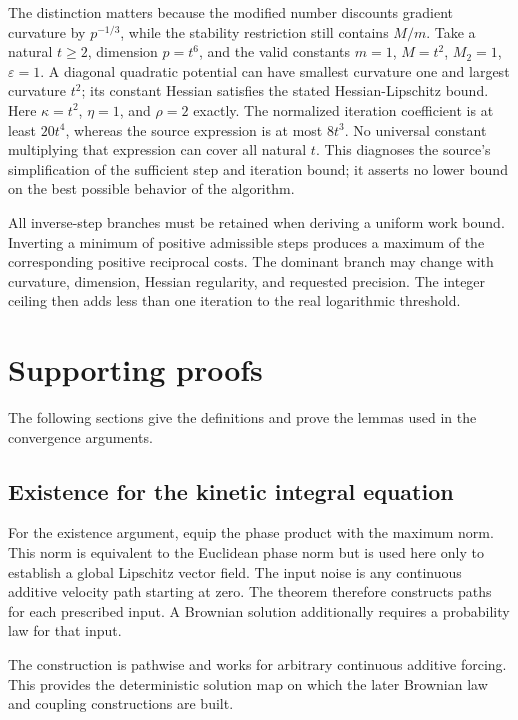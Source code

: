 \documentclass[11pt,a4paper]{report}
\begin{document}
The distinction matters because the modified number discounts gradient
curvature by \(p^{-1/3}\), while the stability restriction still
contains \(M/m\). Take a natural \(t\ge2\), dimension \(p=t^6\),
and the valid constants \(m=1\), \(M=t^2\), \(M_2=1\),
\(\varepsilon=1\). A diagonal quadratic potential can have smallest
curvature one and largest curvature \(t^2\); its constant Hessian satisfies
the stated Hessian-Lipschitz bound. Here \(\kappa=t^2\),
\(\eta=1\), and \(\rho=2\) exactly. The normalized iteration
coefficient is at least \(20t^4\), whereas the source expression is at most
\(8t^3\). No universal constant multiplying that expression can cover all
natural \(t\). This diagnoses the source's simplification of the sufficient step and iteration bound;
it asserts no lower bound on the best possible behavior of the algorithm.



All inverse-step branches must be retained when deriving a uniform work bound. Inverting a minimum of positive admissible steps produces a maximum of the corresponding positive reciprocal costs. The dominant branch may change with curvature, dimension, Hessian regularity, and requested precision. The integer ceiling then adds less than one iteration to the real logarithmic threshold.

\chapter{Supporting proofs}
The following sections give the definitions and prove the lemmas used in the convergence arguments.

\section{\texorpdfstring{Existence for the kinetic integral equation}{Existence for the kinetic integral equation}}
\label{proof-module-KineticLangevin-Dynamics-lean}


For the existence argument, equip the phase product with the maximum norm. This norm is equivalent to the Euclidean phase norm but is used here only to establish a global Lipschitz vector field. The input noise is any continuous additive velocity path starting at zero. The theorem therefore constructs paths for each prescribed input. A Brownian solution additionally requires a probability law for that input.



The construction is pathwise and works for arbitrary continuous additive forcing. This provides the deterministic solution map on which the later Brownian law and coupling constructions are built.
\end{document}
